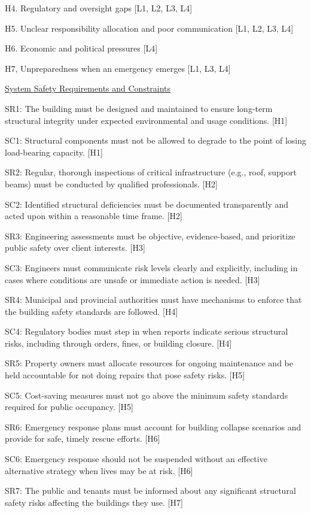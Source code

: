 \documentclass[12pt]{article}
\begin{document}
H4. Regulatory and oversight gaps [L1, L2, L3, L4]

H5. Unclear responsibility allocation and poor communication [L1, L2, L3, L4]

H6. Economic and political pressures [L4]

H7, Unpreparedness when an emergency emerges [L1, L3, L4]

\underline{System Safety Requirements and Constraints}

SR1: The building must be designed and maintained to ensure long-term structural integrity under expected environmental and usage conditions. [H1]

SC1: Structural components must not be allowed to degrade to the point of losing load-bearing capacity. [H1]

SR2: Regular, thorough inspections of critical infrastructure (e.g., roof, support beams) must be conducted by qualified professionals. [H2]

SC2: Identified structural deficiencies must be documented transparently and acted upon within a reasonable time frame. [H2]

SR3: Engineering assessments must be objective, evidence-based, and prioritize public safety over client interests. [H3]

SC3: Engineers must communicate risk levels clearly and explicitly, including in cases where conditions are unsafe or immediate action is needed. [H3]

SR4: Municipal and provincial authorities must have mechanisms to enforce that the building safety standards are followed. [H4]

SC4: Regulatory bodies must step in when reports indicate serious structural risks, including through orders, fines, or building closure. [H4]

SR5: Property owners must allocate resources for ongoing maintenance and be held accountable for not doing repairs that pose safety risks. [H5]

SC5: Cost-saving measures must not go above the minimum safety standards required for public occupancy. [H5]

SR6: Emergency response plans must account for building collapse scenarios and provide for safe, timely rescue efforts. [H6]

SC6: Emergency response should not be suspended without an effective alternative strategy when lives may be at risk. [H6]

SR7: The public and tenants must be informed about any significant structural safety risks affecting the buildings they use. [H7]
\end{document}
